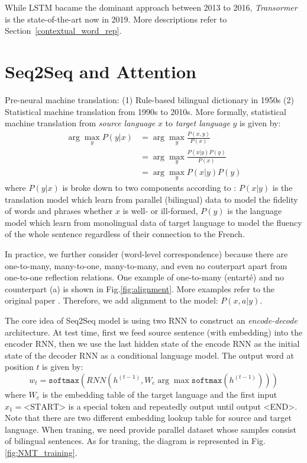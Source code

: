 While LSTM bacame the dominant approach between 2013 to 2016, \emph{Transormer} is the state-of-the-art now in 2019.
More descriptions refer to Section~\ref{contextual_word_rep}.

\section{Seq2Seq and Attention}
Pre-neural machine translation: (1) Rule-based bilingual dictionary in 1950s (2) Statistical machine translation from 1990s to 2010s.
More formally, statistical machine translation from \emph{source language} $x$ to \emph{target language} $y$ is given by:
\begin{align}
\arg \max_y P(y | x) &= \arg \max_y \frac{P(x, y)}{P(x)} \nonumber \\
&= \arg \max_y \frac{P(x | y) P(y)}{P(x)} \nonumber \\
&= \arg \max_y P(x | y) P(y) \nonumber
\end{align}
where $P(y | x)$ is broke down to two components according to : $P(x | y)$ is the translation model which learn from parallel (bilingual) data to model the fidelity of words and phrases whether $x$ is well- or ill-formed, $P(y)$ is the language model which learn from monolingual data of target language to model the fluency of the whole sentence regardless of their connection to the French. 


In practice, we further consider  (word-level correspondence) because there are one-to-many, many-to-one, many-to-many, and even no couterpart apart from one-to-one reflection relations.
One example of one-to-many (entarté) and no counterpart (a) is shown in Fig.\ref{fig:alignment}.
More examples refer to the original paper .
Therefore, we add alignment to the model: $P(x, a | y)$.

The core idea of Seq2Seq model is using two RNN to construct an \emph{encode-decode} architecture.
At test time, first we feed source sentence (with embedding) into the encoder RNN, then we use the last hidden state of the encode RNN as the initial state of the decoder RNN as a conditional language model.
The output word at position $t$ is given by:
\begin{equation}
w_t = \texttt{softmax}(RNN(h^{(t-1)}, W_e \arg \max \texttt{softmax}(h^{(t-1)}))) \nonumber
\end{equation}
where $W_e$ is the embedding table of the target language and the first input $x_1 = \text{<START>}$ is a special token and repeatedly output until output <END>.
Note that there are two different embedding lookup table for source and target language.
When traning, we need provide parallel dataset whose samples consist of bilingual sentences.
As for traning, the diagram is represented in Fig.\ref{fig:NMT_training}.

